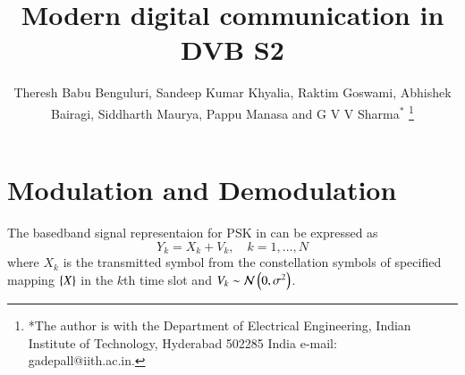 \documentclass[journal,12pt,twocolumn]{IEEEtran}
\begin{document}


\let\StandardTheFigure\thefigure
\let\StandardTheTable\thetable





\def\putbox#1#2#3{\makebox[0in][l]{\makebox[#1][l]{}\raisebox{\baselineskip}[0in][0in]{\raisebox{#2}[0in][0in]{#3}}}}
     \def\rightbox#1{\makebox[0in][r]{#1}}
     \def\centbox#1{\makebox[0in]{#1}}
     \def\topbox#1{\raisebox{-\baselineskip}[0in][0in]{#1}}
     \def\midbox#1{\raisebox{-0.5\baselineskip}[0in][0in]{#1}}




\title{ 
Modern digital communication in DVB S2
}



\author{Theresh Babu Benguluri, Sandeep Kumar Khyalia, Raktim Goswami, Abhishek Bairagi, Siddharth Maurya, Pappu Manasa and G V V 
Sharma$^{*}$%
\thanks{*The author is with the Department
of Electrical Engineering, Indian Institute of Technology, Hyderabad
502285 India e-mail:  gadepall@iith.ac.in.}
}


\maketitle

\tableofcontents

\bigskip
%


%
\section{Modulation and Demodulation}
The basedband signal representaion for PSK in \cite{dvbs2} can be expressed as 
\begin{equation}
Y_k= X_k + V_k, \quad k = 1,\dots,N
\end{equation} 
where $X_k$ is the transmitted symbol from the constellation symbols of specified mapping $\left\{X\right\}$ in the $k$th time slot and $V_k \sim \mathcal{N}\left(0,\sigma^2\right) $.
\end{document}
